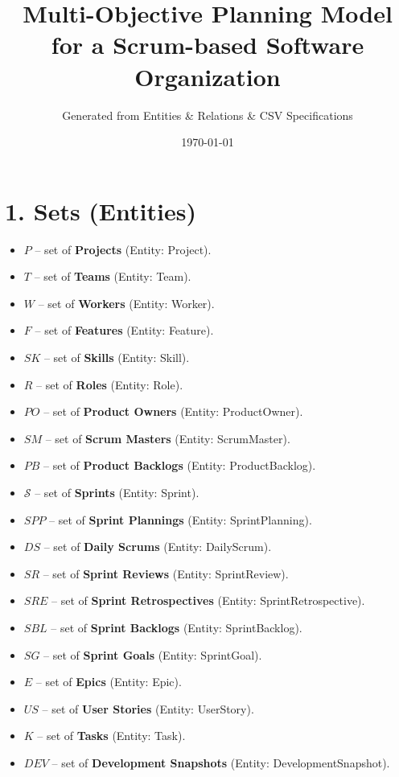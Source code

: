 \documentclass[11pt,a4paper]{article}
\title{Multi-Objective Planning Model for a Scrum-based Software Organization}
\author{Generated from Entities \& Relations \& CSV Specifications}
\date{\today}
\begin{document}
\maketitle
\tableofcontents
\newpage

\section{1. Sets (Entities)}
\begin{itemize}
  \item $P$ -- set of \textbf{Projects} (Entity: Project).
  \item $T$ -- set of \textbf{Teams} (Entity: Team).
  \item $W$ -- set of \textbf{Workers} (Entity: Worker).
  \item $F$ -- set of \textbf{Features} (Entity: Feature).
  \item $S\!K$ -- set of \textbf{Skills} (Entity: Skill).
  \item $R$ -- set of \textbf{Roles} (Entity: Role).
  \item $PO$ -- set of \textbf{Product Owners} (Entity: ProductOwner).
  \item $SM$ -- set of \textbf{Scrum Masters} (Entity: ScrumMaster).
  \item $PB$ -- set of \textbf{Product Backlogs} (Entity: ProductBacklog).
  \item $\mathcal{S}$ -- set of \textbf{Sprints} (Entity: Sprint).
  \item $SPP$ -- set of \textbf{Sprint Plannings} (Entity: SprintPlanning).
  \item $DS$ -- set of \textbf{Daily Scrums} (Entity: DailyScrum).
  \item $SR$ -- set of \textbf{Sprint Reviews} (Entity: SprintReview).
  \item $SRE$ -- set of \textbf{Sprint Retrospectives} (Entity: SprintRetrospective).
  \item $SBL$ -- set of \textbf{Sprint Backlogs} (Entity: SprintBacklog).
  \item $SG$ -- set of \textbf{Sprint Goals} (Entity: SprintGoal).
  \item $E$ -- set of \textbf{Epics} (Entity: Epic).
  \item $US$ -- set of \textbf{User Stories} (Entity: UserStory).
  \item $K$ -- set of \textbf{Tasks} (Entity: Task).
  \item $DEV$ -- set of \textbf{Development Snapshots} (Entity: DevelopmentSnapshot).

\end{itemize}
\end{document}

